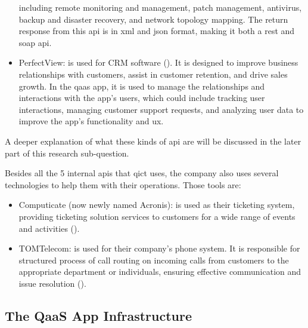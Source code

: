 \begin{multicols}{2}
\begin{itemize}
                  including remote monitoring and management, patch management, antivirus, backup and disaster
                  recovery, and network topology mapping. The return response from this \acrshort{api} is in \acrshort{xml}
                  and \acrshort{json} format, making it both a \acrshort{rest} and \acrshort{soap} \acrshort{api}.
            \item PerfectView: is used for \gls{CRM} software (\textit{\cite{perfectView}}). It is designed to
                  improve business relationships with customers, assist in customer retention, and drive sales growth.
                  In the \acrshort{qaas} app, it is used to manage the relationships and interactions with the app's users,
                  which could include tracking user interactions, managing customer support requests, and analyzing user
                  data to improve the app's functionality and \acrshort{ux}.
      \end{itemize}

      A deeper explanation of what these kinds of \acrshort{api} are will be discussed in the later part of this research sub-question.

      Besides all the 5 internal \acrshort{api}s that \acrshort{qict} uses, the company also uses several technologies to help them with their
      operations. Those tools are:

      \begin{itemize}
            \item Computicate (now newly named Acronis): is used as their ticketing system, providing ticketing solution services to customers for
                  a wide range of events and activities (\textit{\cite{computicate}}).
            \item TOMTelecom: is used for their company's phone system. It is responsible for structured process of call routing on incoming calls
                  from customers to the appropriate department or individuals, ensuring effective communication and issue resolution
                  (\textit{\cite{tomTelecom}}).
      \end{itemize}

      \subsection{The QaaS App Infrastructure}


\end{multicols}
